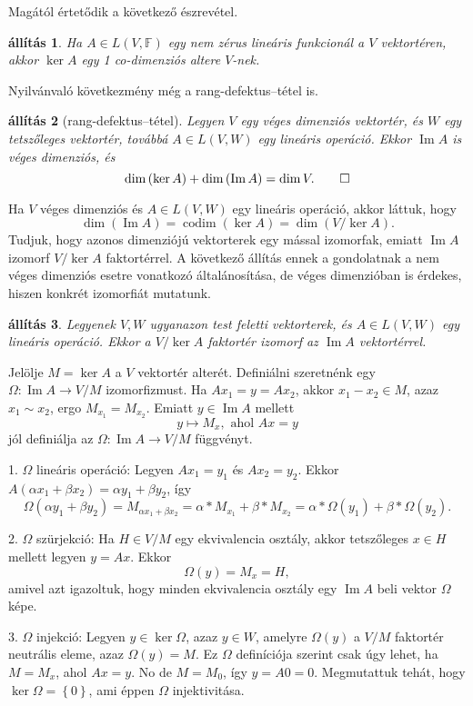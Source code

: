 \documentclass[9pt, showtrims]{memoir}
\makeatletter
\renewenvironment{proof}[1][\proofname]
    {\par\pushQED{\qed}%
    \normalfont \topsep6\p@\@plus6\p@\relax
    \trivlist
    \item[\hskip\labelsep
        \itshape
    #1\@addpunct{:}]\ignorespaces}
    {\popQED\endtrivlist\@endpefalse}
\theoremstyle{plain}
\newtheorem{proposition}{állítás}[section]
\theoremstyle{remark}
\theoremstyle{definition}
\DeclareMathOperator{\codim}{codim}
\DeclareMathOperator{\im}{Im}
\makeatother
\begin{document}
Magától értetődik a következő észrevétel.
\begin{proposition}
Ha $A\in L\left( V,\mathbb{F} \right)$ egy nem zérus lineáris funkcionál a $V$ vektortéren,
akkor $\ker A$ egy 1 co-dimenziós altere $V$-nek.
\end{proposition}
Nyilvánvaló következmény még a rang-defektus--tétel is.
\begin{proposition}[rang-defektus--tétel]
    Legyen $V$ egy véges dimenziós vektortér,
    és $W$ egy tetszőleges vektortér, 
    továbbá $A\in L\left( V,W \right)$ egy lineáris operáció.
    Ekkor
    $\im A$ is véges dimenziós, és
    \[
        \dim\left( \ker A \right)+\dim\left( \im A \right)=\dim V.\qedhere
    \]
\end{proposition}

Ha $V$ véges dimenziós és $A\in L\left( V,W \right)$ egy lineáris operáció,
akkor láttuk, hogy
\[
\dim\left( \im A \right)
=
\codim\left( \ker A \right)
=
\dim\left( V/\ker A \right).
\]
Tudjuk, hogy azonos dimenziójú vektorterek egy mással izomorfak,
emiatt $\im A$ izomorf $V/\ker A$ faktortérrel.
A következő állítás ennek a gondolatnak a nem véges dimenziós esetre vonatkozó általánosítása,
de véges dimenzióban is érdekes, hiszen konkrét izomorfiát mutatunk.
\begin{proposition}
    Legyenek $V,W$ ugyanazon test feletti vektorterek,
    és $A\in L\left( V,W \right)$ egy lineáris operáció.
    Ekkor a
    \(
        V/\ker A
    \)
    faktortér izomorf az $\im A$ vektortérrel.
\end{proposition}
\begin{proof}
    Jelölje $M=\ker A$ a $V$ vektortér alterét.
    Definiálni szeretnénk egy $\Omega:\im A\to V/M$ izomorfizmust.
    Ha $Ax_1=y=Ax_2$, akkor $x_1-x_2\in M$, azaz $x_1\sim x_2$, ergo $M_{x_1}=M_{x_2}$.
    Emiatt $y\in\im A$ mellett
    \[
        y\mapsto M_x, \text{ ahol } Ax=y
    \]
    jól definiálja az $\Omega:\im A\to V/M$ függvényt.
    
    1. $\Omega$ lineáris operáció:
    Legyen $Ax_1=y_1$ és $Ax_2=y_2$.
    Ekkor 
    $A\left( \alpha x_1+\beta x_2 \right)=\alpha y_1+\beta y_2$, így
    \[
    \Omega\left( \alpha y_1+\beta y_2 \right)
    =
    M_{\alpha x_1+\beta x_2}
    =
    \alpha\ast M_{x_1}+\beta\ast M_{x_2}
    =
    \alpha\ast \Omega\left( y_1 \right)+\beta\ast\Omega\left( y_2 \right).
    \]

    2. $\Omega$ szürjekció:
    Ha $H\in V/M$ egy ekvivalencia osztály, 
    akkor tetszőleges $x\in H$ mellett legyen $y=Ax$.
    Ekkor
    \[
        \Omega\left( y \right)=M_x=H,
    \]
    amivel azt igazoltuk, 
    hogy minden ekvivalencia osztály egy $\im A$ beli vektor $\Omega$ képe.


    3. $\Omega$ injekció:
    Legyen $y\in\ker\Omega$, azaz $y\in W$, amelyre $\Omega\left( y \right)$ a $V/M$ faktortér neutrális eleme,
    azaz 
    $\Omega\left( y \right)=M$.
    Ez $\Omega$ definíciója szerint csak úgy lehet, ha $M=M_x$, ahol $Ax=y$.
    No de $M=M_0$, így $y=A0=0$.
    Megmutattuk tehát, hogy $\ker \Omega=\left\{ 0 \right\}$,
    ami éppen $\Omega$ injektivitása.
\end{proof}
\end{document}
